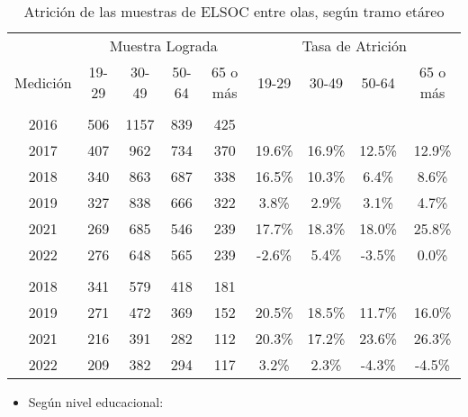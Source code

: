 \documentclass[
  12pt,
]{article}
\providecommand{\tightlist}{%
  \setlength{\itemsep}{0pt}\setlength{\parskip}{0pt}}
\begin{document}
\begin{table}[H]

\caption{\label{tab:tabla-atricion-edad}Atrición de las muestras de ELSOC entre olas, según tramo etáreo}
\centering
\begin{tabular}[t]{ccccccccc}
\toprule
\multicolumn{1}{c}{ } & \multicolumn{4}{c}{Muestra Lograda} & \multicolumn{4}{c}{Tasa de Atrición} \\
\cmidrule(l{3pt}r{3pt}){2-5} \cmidrule(l{3pt}r{3pt}){6-9}
Medición & 19-29 & 30-49 & 50-64 & 65 o más & 19-29 & 30-49 & 50-64 & 65 o más\\
\midrule
\addlinespace[0.3em]
\multicolumn{9}{l}{\textbf{Muestra Original}}\\
\hspace{1em}2016 & 506 & 1157 & 839 & 425 &  &  &  & \\
\hspace{1em}2017 & 407 & 962 & 734 & 370 & 19.6\% & 16.9\% & 12.5\% & 12.9\%\\
\hspace{1em}2018 & 340 & 863 & 687 & 338 & 16.5\% & 10.3\% & 6.4\% & 8.6\%\\
\hspace{1em}2019 & 327 & 838 & 666 & 322 & 3.8\% & 2.9\% & 3.1\% & 4.7\%\\
\hspace{1em}2021 & 269 & 685 & 546 & 239 & 17.7\% & 18.3\% & 18.0\% & 25.8\%\\
\hspace{1em}2022 & 276 & 648 & 565 & 239 & -2.6\% & 5.4\% & -3.5\% & 0.0\%\\
\addlinespace[0.3em]
\multicolumn{9}{l}{\textbf{Muestra Refresco}}\\
\hspace{1em}2018 & 341 & 579 & 418 & 181 &  &  &  & \\
\hspace{1em}2019 & 271 & 472 & 369 & 152 & 20.5\% & 18.5\% & 11.7\% & 16.0\%\\
\hspace{1em}2021 & 216 & 391 & 282 & 112 & 20.3\% & 17.2\% & 23.6\% & 26.3\%\\
\hspace{1em}2022 & 209 & 382 & 294 & 117 & 3.2\% & 2.3\% & -4.3\% & -4.5\%\\
\bottomrule
\end{tabular}
\end{table}

\begin{itemize}
\tightlist
\item
  Según nivel educacional:
\end{itemize}
\end{document}
